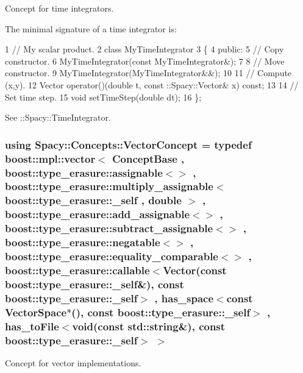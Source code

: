 Concept for time integrators. 

\label{group__ConceptGroup_ga45ecfe57ffb996aa97c9ff89a647f095_TimeIntegratorConceptAnchor}%
\hypertarget{group__ConceptGroup_ga45ecfe57ffb996aa97c9ff89a647f095_TimeIntegratorConceptAnchor}{}%
The minimal signature of a time integrator is\+: 
\begin{DoxyCode}
1 // My scalar product.
2 class MyTimeIntegrator
3 \{
4 public:
5   // Copy constructor.
6   MyTimeIntegrator(const MyTimeIntegrator&);
7 
8   // Move constructor.
9   MyTimeIntegrator(MyTimeIntegrator&&);
10 
11   // Compute (x,y).
12   Vector operator()(double t, const ::Spacy::Vector& x) const;
13 
14   // Set time step.
15   void setTimeStep(double dt);
16 \};
\end{DoxyCode}


See \+:\+:Spacy\+:\+:Time\+Integrator. \hypertarget{group__ConceptGroup_gad6958389d1fa2758a8a64a0a24c36004_gad6958389d1fa2758a8a64a0a24c36004}{}
\subsubsection[{Vector\+Concept}]{\setlength{\rightskip}{0pt plus 5cm}using {\bf Spacy\+::\+Concepts\+::\+Vector\+Concept} = typedef boost\+::mpl\+::vector$<$ {\bf Concept\+Base} , boost\+::type\+\_\+erasure\+::assignable$<$$>$ , boost\+::type\+\_\+erasure\+::multiply\+\_\+assignable$<$ boost\+::type\+\_\+erasure\+::\+\_\+self , double $>$ , boost\+::type\+\_\+erasure\+::add\+\_\+assignable$<$$>$ , boost\+::type\+\_\+erasure\+::subtract\+\_\+assignable$<$$>$ , boost\+::type\+\_\+erasure\+::negatable$<$$>$ , boost\+::type\+\_\+erasure\+::equality\+\_\+comparable$<$$>$ , boost\+::type\+\_\+erasure\+::callable$<${\bf Vector}(const boost\+::type\+\_\+erasure\+::\+\_\+self\&), const boost\+::type\+\_\+erasure\+::\+\_\+self$>$ , has\+\_\+space$<$const {\bf Vector\+Space}$\ast$(), const boost\+::type\+\_\+erasure\+::\+\_\+self$>$ , has\+\_\+to\+File$<$void(const std\+::string\&), const boost\+::type\+\_\+erasure\+::\+\_\+self$>$ $>$}\label{group__ConceptGroup_gad6958389d1fa2758a8a64a0a24c36004_gad6958389d1fa2758a8a64a0a24c36004}


Concept for vector implementations. 

